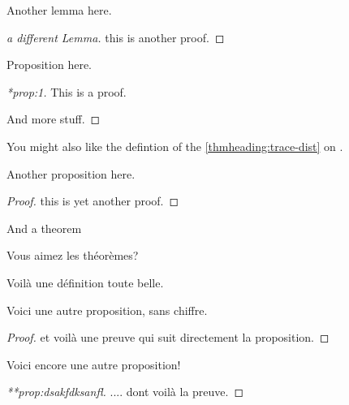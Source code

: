 \documentclass[12pt,a5paper]{article}
\begin{document}

\begin{lemma}
\label{lem:1}
Another lemma here.
\end{lemma}
\begin{proof}[a different Lemma]
  this is another proof.
\end{proof}


\begin{proposition}
  \label{prop:1}
  Proposition here.
\end{proposition}
\begin{proof}[*prop:1]
  This is a proof.

  And more stuff.
\end{proof}


You might also like the defintion of the \ref{thmheading:trace-dist} on .

\begin{proposition}
  \noproofref
  Another proposition here.
\end{proposition}
\begin{proof}
  this is yet another proof.
\end{proof}


\begin{theorem}
\label{thm:1}
And a theorem
\end{theorem}



\begin{theorem}
\noproofref
\label{thm:2}
Vous aimez les th\'eor\`emes?
\end{theorem}

\begin{definition*}
Voil\`a une d\'efinition toute belle.
\end{definition*}


\begin{proposition*}
Voici une autre proposition, sans chiffre.
\end{proposition*}
\begin{proof}
  et voil\`a une preuve qui suit directement la proposition.
\end{proof}


\begin{proposition}
  \label{prop:dsakfdksanfl}
  Voici encore une autre proposition!
\end{proposition}
\begin{proof}[**prop:dsakfdksanfl]
  .... dont voil\`a la preuve.
\end{proof}
\end{document}
